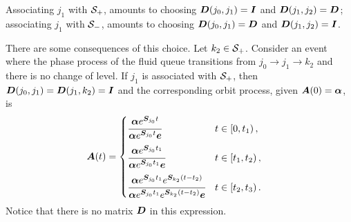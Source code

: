 
Associating \({j_1}\) with \(\mathcal{S}_+\), amounts to choosing \(\boldsymbol{D}({j_0},{j_1})=\boldsymbol{I}\) and \(\boldsymbol{D}({j_1},{j_2})=\boldsymbol{D}\); associating \({j_1}\) with \(\mathcal{S}_-\), amounts to choosing \(\boldsymbol{D}({j_0},{j_1})=\boldsymbol{D}\) and \(\boldsymbol{D}({j_1},{j_2})=\boldsymbol{I}\). 

There are some consequences of this choice. Let \(k_2\in{}\mathcal{S}_+\). Consider an event where the phase process of the fluid queue transitions from \({j_0}\to {j_1}\to k_2\) and there is no change of level. If \({j_1}\) is associated with \(\mathcal{S}_+\), then \(\boldsymbol{D}({j_0},{j_1})=\boldsymbol{D}({j_1},k_2)=\boldsymbol{I}\) and the corresponding orbit process, given \(\boldsymbol A(0) = \boldsymbol \alpha\), is 
\begin{align*}
\boldsymbol A(t) &= \begin{cases} 
	\cfrac{\boldsymbol \alpha e^{\boldsymbol{S}_{j_0}t}}{\boldsymbol \alpha e^{\boldsymbol{S}_{{j_0}}t}\boldsymbol e} & t\in\left[0,t_1\right), \\[10pt]
	\cfrac{\boldsymbol \alpha e^{\boldsymbol{S}_{j_0}t_1}}{\boldsymbol \alpha e^{\boldsymbol{S}_{j_0}t_1}\boldsymbol e} & t\in\left[t_1,t_2\right), \\[10pt] 
	\cfrac{\boldsymbol \alpha e^{\boldsymbol{S}_{j_0}t_1}e^{\boldsymbol{S}_{k_2}(t-t_2)}}{\boldsymbol \alpha e^{\boldsymbol{S}_{j_0}t_1}e^{\boldsymbol{S}_{k_2}(t-t_2)}\boldsymbol e} & t\in\left[t_2,t_3\right).
\end{cases}
\end{align*}
Notice that there is no matrix \(\boldsymbol D\) in this expression. 

